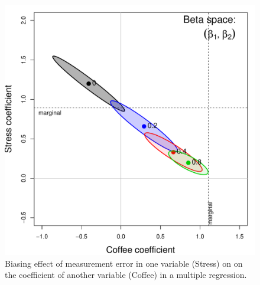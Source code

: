 \begin{figure}[htb]
  \centering
  \includegraphics[width=.5\textwidth,clip]{fig/coffee-measerr}
  \caption{Biasing effect of measurement error in one variable (Stress) on on the coefficient of another variable
  (Coffee) in a multiple regression.  
  }%
  \label{fig:coffee-measerr}
\end{figure}


